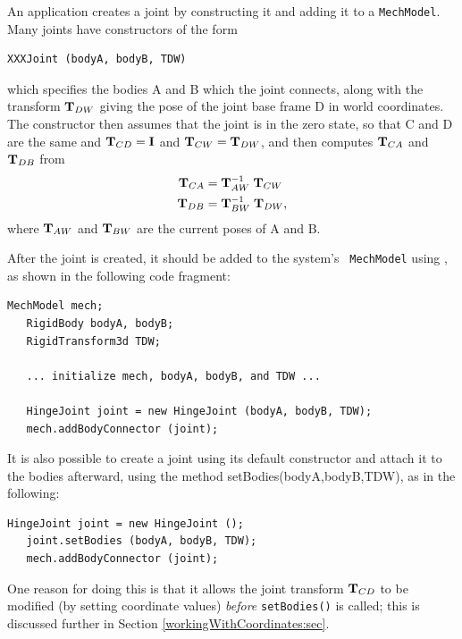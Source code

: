 An application creates a joint by constructing it and adding it to a
{\tt MechModel}. Many joints have constructors of the form
%
\begin{lstlisting}[]
  XXXJoint (bodyA, bodyB, TDW)
\end{lstlisting}
%
which specifies the bodies A and B which the joint connects,
along with the transform ${\bf T}_{DW}$ giving the pose of the joint base
frame D in world coordinates. The constructor then assumes that the
joint is in the zero state, so that C and D are the same and
${\bf T}_{CD} = {\bf I}$ and ${\bf T}_{CW} = {\bf T}_{DW}$, and then computes
${\bf T}_{CA}$ and ${\bf T}_{DB}$ from
%
\begin{align}
{\bf T}_{CA} & = {\bf T}_{AW}^{-1} \; {\bf T}_{CW} \\
{\bf T}_{DB} & = {\bf T}_{BW}^{-1} \; {\bf T}_{DW},
\end{align}
%
where ${\bf T}_{AW}$ and ${\bf T}_{BW}$ are the current poses of A and B.

After the joint is created, it should be added to the system's {\tt
MechModel} using
, as
shown in the following code fragment:
%
\begin{lstlisting}[]
   MechModel mech; 
   RigidBody bodyA, bodyB;
   RigidTransform3d TDW;

   ... initialize mech, bodyA, bodyB, and TDW ...
   
   HingeJoint joint = new HingeJoint (bodyA, bodyB, TDW);
   mech.addBodyConnector (joint);
\end{lstlisting}
%
It is also possible to create a joint using its default
constructor and attach it to the bodies
afterward, using the method 
{setBodies(bodyA,bodyB,TDW)}, as in the following:
%
\begin{lstlisting}[]
   HingeJoint joint = new HingeJoint ();
   joint.setBodies (bodyA, bodyB, TDW);
   mech.addBodyConnector (joint);
\end{lstlisting}
%
One reason for doing this is that it allows the joint transform
${\bf T}_{CD}$ to be modified (by setting coordinate values) {\it before}
{\tt setBodies()} is called; this is discussed further in
Section \ref{workingWithCoordinates:sec}.

